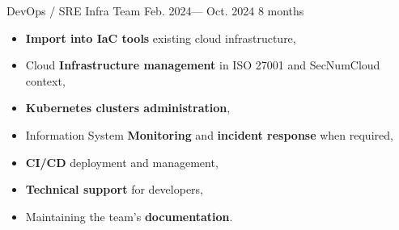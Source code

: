 \jobposition%
{DevOps / SRE}%
{Infra Team}%
{Feb. 2024--- Oct. 2024}%
{8 months}%
{
	\begin{itemize}
	  \item \textbf{Import into IaC tools} existing cloud infrastructure,
		\item Cloud \textbf{Infrastructure management} in ISO 27001 and SecNumCloud
		  context,
		\item \textbf{Kubernetes clusters administration},
		\item Information System \textbf{Monitoring} and \textbf{incident response}
		  when required,
		\item \textbf{CI/CD} deployment and management,
		\item \textbf{Technical support} for developers,
		\item Maintaining the team's \textbf{documentation}.
	\end{itemize}
}
